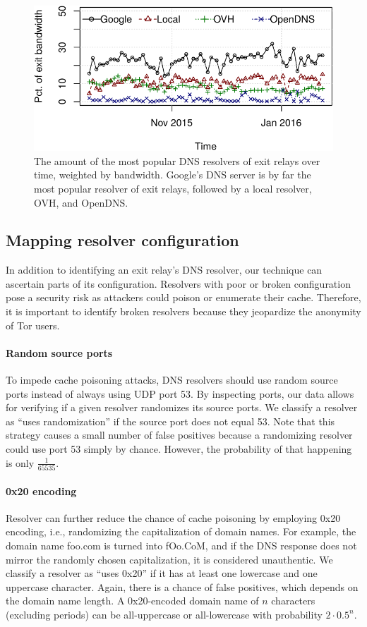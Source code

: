 \begin{figure}[t]
	\centering
	\includegraphics[width=\linewidth]{figures/exit-resolvers.pdf}
	\caption{The amount of the most popular DNS resolvers of exit relays over
	time, weighted by bandwidth.  Google's DNS server is by far the most popular
	resolver of exit relays, followed by a local resolver, OVH, and OpenDNS.}
	\label{fig:exit-resolvers}
\end{figure}

\subsection{Mapping resolver configuration}
In addition to identifying an exit relay's DNS resolver, our technique can
ascertain parts of its configuration.  Resolvers with poor or broken
configuration pose a security risk as attackers could poison or enumerate their
cache.  Therefore, it is important to identify broken resolvers because they
jeopardize the anonymity of Tor users.

\paragraph{Random source ports}
To impede cache poisoning attacks, DNS resolvers should use random source ports
instead of always using UDP port 53.  By inspecting ports, our data allows for
verifying if a given resolver randomizes its source ports.  We classify a
resolver as ``uses randomization'' if the source port does not equal 53.  Note
that this strategy causes a small number of false positives because a
randomizing resolver could use port 53 simply by chance.  However, the
probability of that happening is only $\frac{1}{65535}$.

\paragraph{0x20 encoding}
Resolver can further reduce the chance of cache poisoning by employing 0x20
encoding, i.e., randomizing the capitalization of domain names.  For example,
the domain name foo.com is turned into fOo.CoM, and if the DNS response does not
mirror the randomly chosen capitalization, it is considered unauthentic.  We
classify a resolver as ``uses 0x20'' if it has at least one lowercase and one
uppercase character.  Again, there is a chance of false positives, which depends
on the domain name length.  A 0x20-encoded domain name of $n$ characters
(excluding periods) can be all-uppercase or all-lowercase with probability
$2 \cdot 0.5^n$.

